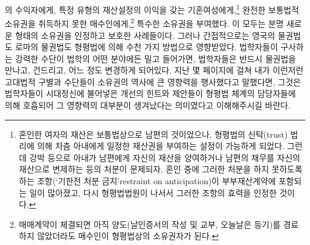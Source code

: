 의 수익자에게,
특정 유형의 재산설정의 이익을 갖는 기혼여성에게,\footnote{%
  혼인한 여자의 재산은 보통법상으로 남편의 것이었으나,
  형평법의 신탁(trust) 법리에 의해
  차츰 아내에게 일정한 재산권을 부여하는 설정이 가능하게 되었다.
  그런데 강박 등으로 아내가 남편에게 자신의 재산을 양여하거나
  남편의 채무를 자신의 재산으로 변제하는 등의 처분이 문제되자,
  혼인 중에 그러한 처분을 하지 못하도록 하는
  조항(`기한전 처분 금지'restraint on anticipation)이
  부부재산계약에 포함되는 일이 많아졌고, 다시
  형평법법원이 나서서 그러한 조항의 효력을 인정한 것이다.
  }
완전한 보통법적 소유권을 취득하지 못한 매수인에게,\footnote{%
  매매계약이 체결되면
  아직 양도(날인증서의 작성 및 교부, 오늘날은 등기)를 경료하지 않았더라도
  매수인이 형평법상의 소유권자가 된다. }
특수한 소유권을 부여했다.
이 모두는 분명 새로운 형태의 소유권을 인정하고 보호한 사례들이다.
그러나
간접적으로는
영국의 물권법도 로마의 물권법도
형평법에 의해 수천 가지 방법으로 영향받았다.
법학자들이 구사하는 강력한 수단이
법학의 어떤 분야에든
밀고 들어가면,
법학자들은
반드시
물권법을 만나고, 건드리고, 어느 정도 변경하게 되어있다.
지난 몇 페이지에 걸쳐
내가
이런저런 고대법적 구별과 수단들이
소유권의 역사에 큰 영향력을 행사했다고
말했다면,
그것은
법학자들이
시대정신에
불어넣은 개선의 힌트와 제안들이
형평법 체계의 담당자들에 의해 호흡되어
그 영향력의 대부분이 생겨났다는
의미였다고 이해해주시길 바란다.

